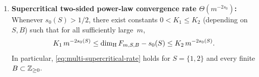 \begin{theorem}
\begin{enumerate}[label=\textup{(\roman*)},leftmargin=2.2em]
\[\]
\[
\lim_{m\to\infty}\frac{\dimH F_{m,S,B}-1/2}{\dimH F_{m,m}-1/2}=d\,C_S.
\]
In particular:
\begin{itemize}[leftmargin=1.5em]
\item for every fixed $r\ge1$,
$\dimH F_{m,r}=\frac12+\frac{C_r}{2m}-\frac{C_r^2\log m}{2m^2}+\frac{C_r(\gamma C_r-C_r')}{2m^2}+O\!\left(\frac{(\log m)^2}{m^3}\right)$,
where $C_r':=\sum_{n=0}^\infty\frac{\log q_n(r)}{q_n(r)}$;
\item for $F_{m,m}$ ($S=\emptyset, B=\{0\}$),
$\dimH F_{m,m}=\frac12+\frac{1}{2m}-\frac{\log m}{2m^2}+\frac{\gamma}{2m^2}+O\!\left(\frac{(\log m)^2}{m^3}\right)$;
\item for $S=\{2,3\}, B=\emptyset$, \eqref{eq:multi-dimH-three-term} holds with $d=2$.
\end{itemize}
\item \textbf{Supercritical two-sided power-law convergence rate $\Theta(m^{-2s_0})$:}
Whenever $s_0(S)>1/2$, there exist constants $0<K_1\le K_2$ (depending on
$S,B$) such that for all sufficiently large~$m$,
\begin{equation}\label{eq:multi-supercritical-rate}
K_1\,m^{-2s_0(S)}\le \dim_{\mathrm{H}} F_{m,S,B}-s_0(S)\le K_2\,m^{-2s_0(S)}.
\end{equation}
In particular, \eqref{eq:multi-supercritical-rate} holds for $S=\{1,2\}$ and
every finite $B\subset\mathbb{Z}_{\ge0}$.
\end{enumerate}
\end{theorem}

